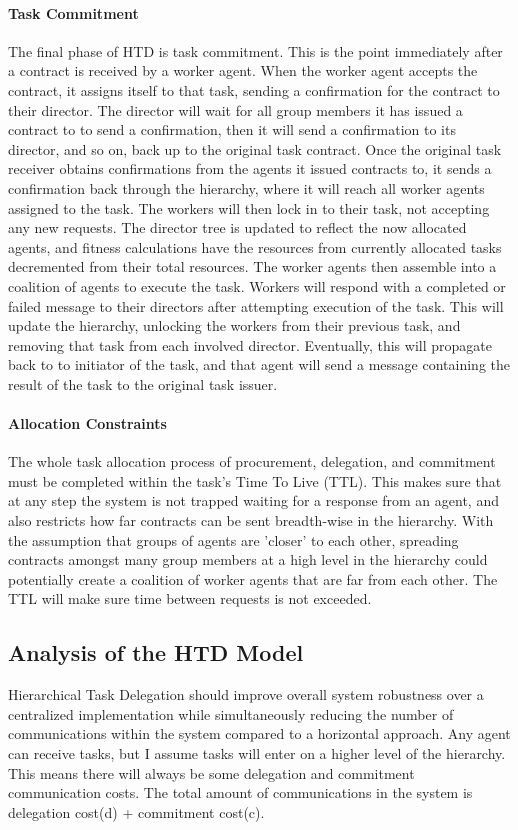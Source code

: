 \documentclass[12pt,letterpaper,onecolumn]{article}
\begin{document}
	\paragraph{Task Commitment}
	The final phase of HTD is task commitment. This is the point immediately after a contract is received by a worker agent. When the worker agent accepts the contract, it assigns itself to that task, sending a confirmation for the contract to their director. The director will wait for all group members it has issued a contract to to send a confirmation, then it will send a confirmation to its director, and so on, back up to the original task contract. Once the original task receiver obtains confirmations from the agents it issued contracts to, it sends a confirmation back through the hierarchy, where it will reach all worker agents assigned to the task. The workers will then lock in to their task, not accepting any new requests. The director tree is updated to reflect the now allocated agents, and fitness calculations have the resources from currently allocated tasks decremented from their total resources. The worker agents then assemble into a coalition of agents to execute the task. Workers will respond with a completed or failed message to their directors after attempting execution of the task. This will update the hierarchy, unlocking the workers from their previous task, and removing that task from each involved director. Eventually, this will propagate back to to initiator of the task, and that agent will send a message containing the result of the task to the original task issuer.
	
	\paragraph{Allocation Constraints}
	The whole task allocation process of procurement, delegation, and commitment must be completed within the task's Time To Live (TTL). This makes sure that at any step the system is not trapped waiting for a response from an agent, and also restricts how far contracts can be sent breadth-wise in the hierarchy. With the assumption that groups of agents are 'closer' to each other, spreading contracts amongst many group  members at a high level in the hierarchy could potentially create a coalition of worker agents that are far from each other. The TTL will make sure time between requests is not exceeded.
	
	\subsection{Analysis of the HTD Model}
	Hierarchical Task Delegation should improve overall system robustness over a centralized implementation while simultaneously reducing the number of communications within the system compared to a horizontal approach. Any agent can receive tasks, but I assume tasks will enter on a higher level of the hierarchy. This means there will always be some delegation and commitment communication costs. The total amount of communications in the system is delegation cost(d) + commitment cost(c).
\end{document}
